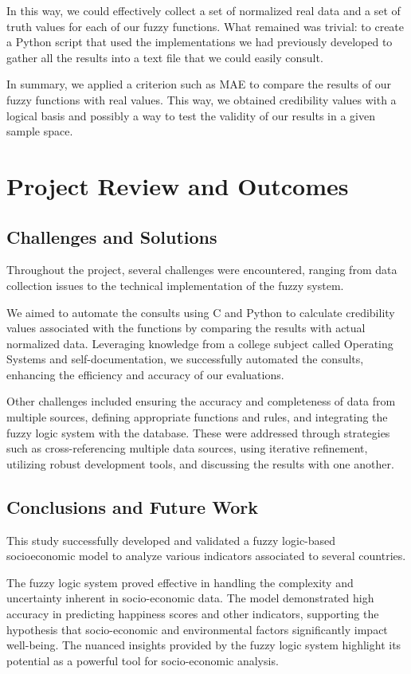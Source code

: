 \documentclass[fleqn,11pt]{article}
\begin{document}
In this way, we could effectively collect a set of normalized real data and a set of truth values for each of our fuzzy functions. What remained was trivial: to create a Python script that used the implementations we had previously developed to gather all the results into a text file that we could easily consult.

In summary, we applied a criterion such as MAE to compare the results of our fuzzy functions with real values. This way, we obtained credibility values with a logical basis and possibly a way to test the validity of our results in a given sample space.

\newpage
\newpage
\section{Project Review and Outcomes}
\subsection{Challenges and Solutions}

Throughout the project, several challenges were encountered, ranging from data collection issues to the technical implementation of the fuzzy system.

We aimed to automate the consults using C and Python to calculate credibility values associated with the functions by comparing the results with actual normalized data. Leveraging knowledge from a college subject called Operating Systems and self-documentation, we successfully automated the consults, enhancing the efficiency and accuracy of our evaluations.

Other challenges included ensuring the accuracy and completeness of data from multiple sources,
defining appropriate functions and rules, and integrating the fuzzy logic system with the database. These were addressed through strategies such as cross-referencing multiple data sources, using iterative refinement, utilizing robust development tools, and discussing the results with one another.

\subsection{Conclusions and Future Work}

This study successfully developed and validated a fuzzy logic-based socioeconomic model to analyze various indicators associated to several countries. 

The fuzzy logic system proved effective in handling the complexity and uncertainty inherent in socio-economic data. The model demonstrated high accuracy in predicting happiness scores and other indicators, supporting the hypothesis that socio-economic and environmental factors significantly impact well-being. The nuanced insights provided by the fuzzy logic system highlight its potential as a powerful tool for socio-economic analysis.
\end{document}

